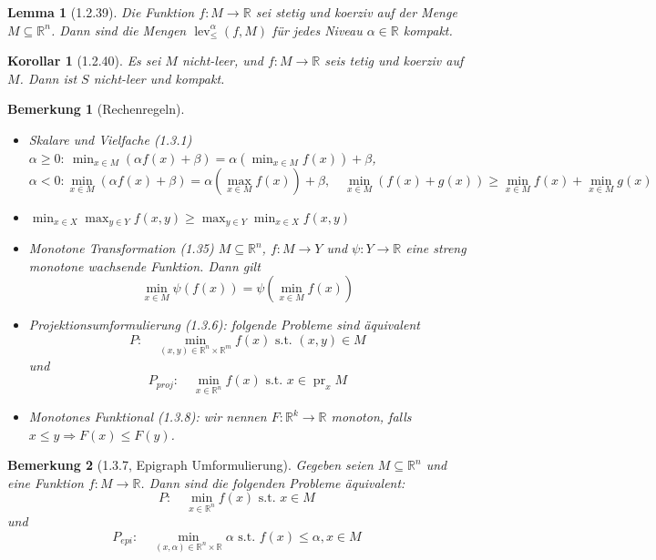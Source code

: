 \documentclass[12pt]{extreport} %
\newcommand{\R}{\mathbb{R}}
\theoremstyle{named}
\theoremstyle{nnamed}
\theoremstyle{itshape}
\theoremstyle{normal}
\newtheorem*{bemerkung}{Bemerkung}
\newtheorem*{korollar}{Korollar}
\newtheorem*{lemma}{Lemma}
\begin{document}
\begin{lemma}[1.2.39]
	Die Funktion $f \colon M \rightarrow \R$ sei stetig und koerziv auf der Menge $M \subseteq \R^n$. Dann sind die Mengen $\operatorname{lev}_{\leq}^{\alpha}(f, M)$ für jedes Niveau $\alpha \in \R$ kompakt.
\end{lemma}

\begin{korollar}[1.2.40]
	Es sei $M$ nicht-leer, und $f \colon M \rightarrow \R$ seis tetig und koerziv auf $M$. Dann ist $S$ nicht-leer und kompakt.
\end{korollar}

\begin{bemerkung}[Rechenregeln] ~\
	\begin{itemize}
		\item Skalare und Vielfache (1.3.1) $\alpha \geq 0: ~ \min_{x \in M} \left( \alpha f(x) + \beta \right) = \alpha \left( \min_{x \in M} f(x) \right) + \beta$,
			$$ \alpha < 0:  \min_{x \in M} \left( \alpha f(x) + \beta \right) = \alpha \left( \max_{x \in M } f(x) \right) + \beta, \quad \min_{x \in M} \left( f(x) + g(x) \right) \geq \min_{x \in M} f(x) + \min_{x \in M} g(x) $$
		\item $\min_{x \in X} \max_{y \in Y} f(x, y) \geq \max_{y \in Y} \min_{x \in X} f(x, y)$
		 \item Monotone Transformation (1.35) $M \subseteq \R^n$, $f \colon M \rightarrow Y$ und $\psi \colon Y \rightarrow \R$ eine streng monotone wachsende Funktion. Dann gilt
		 	$$ \min_{x \in M} \psi(f(x)) = \psi (\min_{x \in M} f(x)) $$
		 \item Projektionsumformulierung (1.3.6): folgende Probleme sind äquivalent
		 	$$ P: \quad \min_{(x,y) \in \R^n \times \R^m} f(x) \text{ s.t. } (x, y) \in M $$
		 	und
		 	$$ P_{proj}: \quad \min_{x \in \R^n} f(x) \text{ s.t. } x \in \operatorname{pr}_x M $$
		 \item Monotones Funktional (1.3.8): wir nennen $F \colon \R^k \rightarrow \R$ monoton, falls $x \leq y \Rightarrow F(x) \leq F(y)$.
	\end{itemize}
\end{bemerkung}

\begin{bemerkung}[1.3.7, Epigraph Umformulierung]
	Gegeben seien $M \subseteq \R^n$ und eine Funktion $f \colon M \rightarrow \R$. Dann sind die folgenden Probleme äquivalent:
	$$ P: \quad \min_{x \in \R^n} f(x) \text{ s.t. } x \in M $$
	und 
		$$ P_{epi}: \quad \min_{(x, \alpha) \in \R^n \times \R} \alpha \text{ s.t. } f(x) \leq \alpha, x\in M $$
\end{bemerkung}
\end{document}
